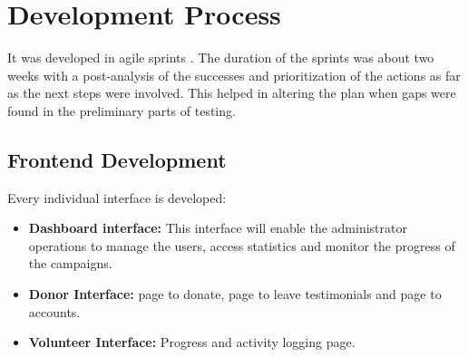 \documentclass{thesis-library}
\begin{document}
\section{Development Process}

It was developed in agile sprints \cite{beck2001agile,highsmith2001agile}. The duration of the sprints was about two weeks with a post-analysis of the successes and prioritization of the actions as far as the next steps were involved. This helped in altering the plan when gaps were found in the preliminary parts of testing.

\subsection{Frontend Development}
Every individual interface is developed:
\begin{itemize}
    \item \textbf{Dashboard interface:} This interface will enable the administrator operations to manage the users, access statistics and monitor the progress of the campaigns.
    \item \textbf{Donor Interface:} page to donate, page to leave testimonials and page to accounts.
    \item \textbf{Volunteer Interface:} Progress and activity logging page.
\end{itemize}
\end{document}

